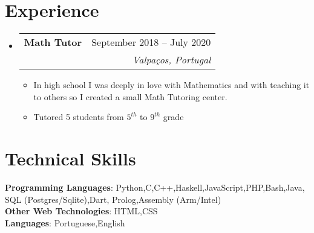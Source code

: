 \documentclass[letterpaper,11pt]{article}
\makeatletter
\newcommand{\resumeItem}[1]{
  \item\small{
    {#1 \vspace{-2pt}}
  }
}
\newcommand{\resumeSubheading}[4]{
  \vspace{-2pt}\item
    \begin{tabular*}{0.97\textwidth}[t]{l@{\extracolsep{\fill}}r}
      \textbf{#1} & #2 \\
      \textit{\small#3} & \textit{\small #4} \\
    \end{tabular*}\vspace{-7pt}
}
\newcommand{\resumeSubHeadingListStart}{\begin{itemize}[leftmargin=0.15in, label={}]}
\newcommand{\resumeSubHeadingListEnd}{\end{itemize}}
\newcommand{\resumeItemListStart}{\begin{itemize}}
\newcommand{\resumeItemListEnd}{\end{itemize}\vspace{-5pt}}
\makeatother
\begin{document}
\section{Experience}
  \resumeSubHeadingListStart
    \resumeSubheading
      {Math Tutor}{September 2018 -- July 2020}
      {}{Valpaços, Portugal}
      \resumeItemListStart
        \resumeItem{In high school I was deeply in love with Mathematics and with teaching it to others so I created a small Math Tutoring center.}\\
        \resumeItem{Tutored 5 students from $5^{th}$  to $9^{th}$ grade}
      \resumeItemListEnd
  \resumeSubHeadingListEnd

\section{Technical Skills}
 \begin{itemize}[leftmargin=0.15in, label={}]
    \small{\item{
     \textbf{Programming Languages}{: Python,C,C++,Haskell,JavaScript,PHP,Bash,Java, SQL (Postgres/Sqlite),Dart, Prolog,Assembly (Arm/Intel)}\\
     \textbf{Other Web Technologies}{: HTML,CSS}\\
     \textbf{Languages}{: Portuguese,English} \\
      
    }}
 \end{itemize}
\end{document}
